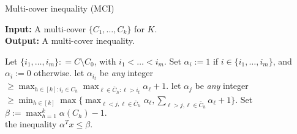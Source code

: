\begin{algorithm}[H]
   \caption{Multi-cover inequality (MCI)}
   \label{alg:mci}
       \hspace*{\algorithmicindent} \textbf{Input:} 
       A multi-cover $\{C_1, \ldots, C_k\}$ for $K$. \\
       \hspace*{\algorithmicindent} \textbf{Output:} 
       A multi-cover inequality.
    \begin{algorithmic}[1]
    \State Let 
    $\{i_1, \ldots, i_m\} : = C \setminus C_0$, with $i_1 < \ldots < i_m$.
    \State Set $\alpha_i := 1$ if $i \in  \{i_1, \ldots, i_m\}$, and $\alpha_i := 0$ otherwise. \label{step: MCI_2}
     \label{step: MCI_3}
        \State 
        let $\alpha_{i_t}$ be \textit{any} integer $\geq \max_{h \in [k]: i_t \in C_h} \max_{\ell \in \bar C_h: \ell>i_t} \alpha_\ell + 1$.
         \label{step: MCI_4}
    \EndFor
\State let $\alpha_j$ be \textit{any} integer $\geq \min_{h \in [k]} \max \big\{ \max_{\ell<j, \ell \in \bar C_h} \alpha_\ell, \sum_{\ell>j, \ell \in \bar C_h} \alpha_\ell + 1 \big\}$.	\label{step: modified_coe_intersection}
\EndFor
    \State Set $\beta := \max_{h=1}^k \alpha(C_h) - 1.$ \label{step: MCI_7}\\
      \Return the inequality $\alpha^T x \leq \beta$.
\end{algorithmic}
\end{algorithm}

